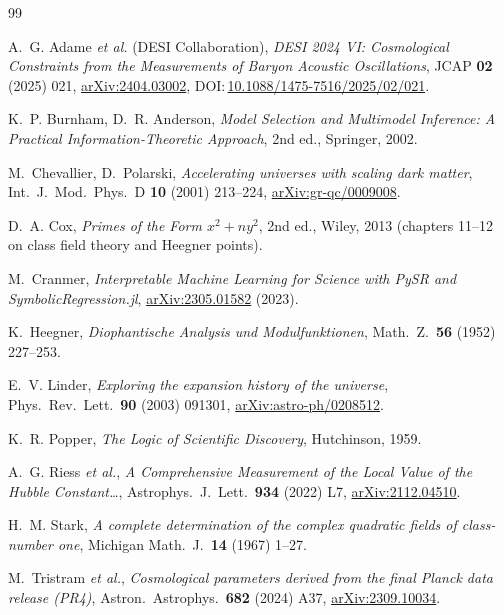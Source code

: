 \documentclass[11pt,letterpaper,twoside]{article}
\begin{document}
\begin{thebibliography}{99}\small

A.~G. Adame \emph{et al.} (DESI Collaboration), \emph{DESI 2024 VI:
Cosmological Constraints from the Measurements of Baryon Acoustic
Oscillations}, JCAP \textbf{02} (2025) 021, \href{https://arxiv.org/abs/2404.03002}{arXiv:2404.03002},
DOI:\,\href{https://doi.org/10.1088/1475-7516/2025/02/021}{10.1088/1475-7516/2025/02/021}.

K.~P. Burnham, D.~R. Anderson, \emph{Model Selection and Multimodel Inference:
A Practical Information-Theoretic Approach}, 2nd ed., Springer, 2002.

M.~Chevallier, D.~Polarski, \emph{Accelerating universes with scaling dark matter},
Int.\ J.\ Mod.\ Phys.\ D \textbf{10} (2001) 213--224,
\href{https://arxiv.org/abs/gr-qc/0009008}{arXiv:gr-qc/0009008}.

D.~A. Cox, \emph{Primes of the Form $x^{2}+ny^{2}$}, 2nd ed., Wiley, 2013
(chapters 11--12 on class field theory and Heegner points).

M.~Cranmer, \emph{Interpretable Machine Learning for Science with PySR and
SymbolicRegression.jl}, \href{https://arxiv.org/abs/2305.01582}{arXiv:2305.01582} (2023).

K.~Heegner, \emph{Diophantische Analysis und Modulfunktionen},
Math.\ Z.\ \textbf{56} (1952) 227--253.

E.~V. Linder, \emph{Exploring the expansion history of the universe},
Phys.\ Rev.\ Lett.\ \textbf{90} (2003) 091301,
\href{https://arxiv.org/abs/astro-ph/0208512}{arXiv:astro-ph/0208512}.

K.~R. Popper, \emph{The Logic of Scientific Discovery}, Hutchinson, 1959.

A.~G. Riess \emph{et al.}, \emph{A Comprehensive Measurement of the Local Value
of the Hubble Constant\dots}, Astrophys.\ J.\ Lett.\ \textbf{934} (2022) L7,
\href{https://arxiv.org/abs/2112.04510}{arXiv:2112.04510}.

H.~M. Stark, \emph{A complete determination of the complex quadratic fields of
class-number one}, Michigan Math.\ J.\ \textbf{14} (1967) 1--27.

M.~Tristram \emph{et al.}, \emph{Cosmological parameters derived from the final
Planck data release (PR4)}, Astron.\ Astrophys.\ \textbf{682} (2024) A37,
\href{https://arxiv.org/abs/2309.10034}{arXiv:2309.10034}.


\end{thebibliography}
\end{document}
